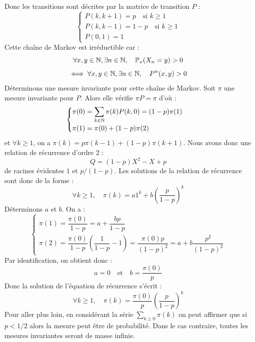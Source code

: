 \begin{example}
    Donc les transitions sont décrites par la matrice de transition $P$ : 
        $$ 
            \begin{cases}
                P(k,k+1) = p \quad \text{si } k \geqslant 1 \\ 
                P(k, k-1) = 1 - p \quad \text{si } k \geqslant 1 \\ 
                P(0,1) = 1 
            \end{cases}
        $$ 
    Cette chaîne de Markov est irréductible car : 
        \[ \forall x,y \in \mathbb{N}, \exists n \in \mathbb{N}, \quad \mathbb{P}_x(X_n = y) > 0  \] 
        \[ \iff \forall x,y \in \mathbb{N}, \exists n \in \mathbb{N}, \quad P^n(x,y) > 0 \]
    Déterminons une mesure invariante pour cette chaîne de Markov. Soit $ \pi$ une mesure invariante pour $P$. 
    Alors elle vérifie $ \pi P = \pi$ d'où : 
        \[ 
            \begin{cases}
                \displaystyle
                \pi(0) = \sum_{k \in \mathbb{N}} \pi(k) P(k,0) = (1-p) \pi(1) \\[1em]
                \displaystyle
                \pi(1) = \pi(0) + (1-p) \pi(2)
            \end{cases}
        \] 
    et $ \forall k \geqslant 1$, on a $ \pi(k) = p \pi(k-1) + (1-p) \pi(k+1)$. Nous avons donc une relation 
    de récurrence d'ordre 2 : 
        $$ Q = (1-p)X^2 - X + p $$ 
    de racines évidentes $1$ et $p/(1-p)$. Les solutions de la relation de récurrence sont donc de la forme : 
            \[ 
                \forall k \geqslant 1, \quad \pi(k) = a 1^k + b \left( \frac{p}{1-p} \right)^k 
            \] 
    Déterminons $a$ et $b$. On a : 
            \[ 
                \begin{cases}
                    \pi(1) = \dfrac{ \pi (0)}{1-p} = a + \dfrac{bp}{1 - p} \\[1em]
                    \pi(2) = \dfrac{ \pi(0)}{1-p} \left( \dfrac{1}{1-p} -1 \right) = \dfrac{ \pi(0) p}{(1-p)^2} = a + b \dfrac{p^2}{(1-p)^2}      
                \end{cases}
            \] 
    Par identification, on obtient donc : 
        \[ a = 0  \quad \text{et} \quad b = \frac{ \pi(0)}{p}  \]
    Donc la solution de l'équation de récurrence s'écrit : 
        \[  \forall k \geqslant 1, \quad \pi(k) = \frac{ \pi(0)}{p} \left( \frac{p}{1-p} \right)^k  \] 
    Pour aller plus loin, en considérant la série $ \sum_{k \geqslant 0} \pi(k)$ on peut affirmer que 
    si $p < 1/2$ alors la mesure peut être de probabilité. Dans le cas contraire, toutes les mesures invariantes seront 
    de masse infinie. 
\end{example}

